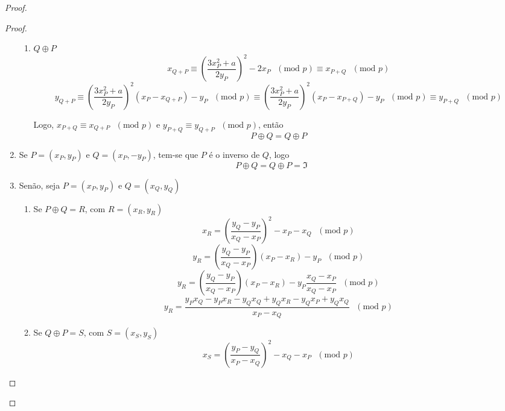 \documentclass[14pt, oneside]{book}
\theoremstyle{definition}
\begin{document}
\begin{proof}
\begin{proof}
\begin{enumerate}
\begin{enumerate}
                                    \item $Q\oplus P$ \\
                                    $$x_{Q+P} \equiv \left(\frac{3x_P^2 + a}{2y_P}\right)^2 -2x_P\textrm{ }(\textrm{mod }p) \equiv x_{P+Q}\textrm{ }(\textrm{mod }p)$$
                                    $$y_{Q+P} \equiv \left(\frac{3x_P^2 + a}{2y_P}\right)^2(x_P-x_{Q+P}) - y_P\textrm{ }(\textrm{mod }p) \equiv \left(\frac{3x_P^2 + a}{2y_P}\right)^2(x_P-x_{P+Q}) - y_P\textrm{ }(\textrm{mod }p) \equiv y_{P+Q}\textrm{ }(\textrm{mod }p)$$
                                    
                                    Logo, $x_{P+Q} \equiv x_{Q+P}\textrm{ }(\textrm{mod }p)$ e $y_{P+Q} \equiv y_{Q+P}\textrm{ }(\textrm{mod }p)$, então 
                                    $$P \oplus Q = Q \oplus P$$
                                \end{enumerate}
                            \item Se $P = (x_P,y_P)$ e $Q = (x_P, -y_P)$, tem-se que $P$ é o inverso de $Q$, logo
                                $$P\oplus Q = Q\oplus P = \Im$$
                            \item Senão, seja $P = (x_P, y_P)$ e $Q = (x_Q,y_Q)$
                                \begin{enumerate}
                                    \item Se $P\oplus Q = R$, com $R = (x_R,y_R)$ \\
                                    \begin{equation}
                                    x_R = \left(\frac{y_Q - y_P}{x_Q - x_P}\right)^2 - x_P - x_Q\textrm{ }(\textrm{mod }p)    
                                    \end{equation}
                                    $$y_R = \left(\frac{y_Q - y_P}{x_Q - x_P}\right)(x_P - x_R) - y_P\textrm{ }(\textrm{mod }p)$$
                                    $$y_R = \left(\frac{y_Q - y_P}{x_Q - x_P}\right)(x_P - x_R) - y_P\frac{x_Q-x_P}{x_Q-x_P}\textrm{ }(\textrm{mod }p)$$
                                    \begin{equation}
                                    y_R = \frac{y_Px_Q -y_Px_R -y_Qx_Q+y_Qx_R -y_Qx_P + y_Qx_Q}{x_P - x_Q}\textrm{ }(\textrm{mod }p)
                                    \end{equation}
                                    \item Se $Q\oplus P = S$, com $S=(x_S, y_S)$
                                        $$x_S = \left(\frac{y_P - y_Q}{x_P - x_Q}\right)^2 - x_Q - x_P\textrm{ }(\textrm{mod }p)$$

\end{enumerate}
\end{enumerate}
\end{proof}
\end{proof}
\end{document}
